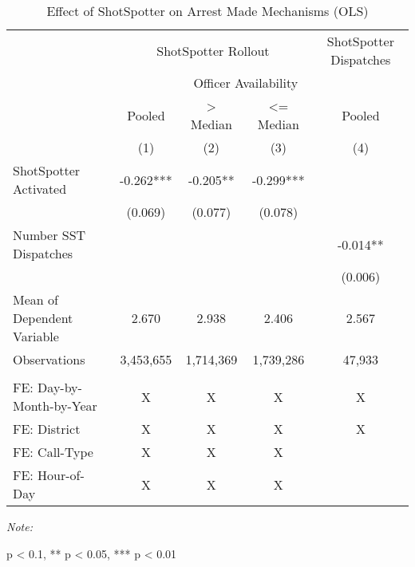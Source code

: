 \begin{table}[H]
\centering
\caption{\label{arrest_mechanism_table}Effect of ShotSpotter on Arrest Made Mechanisms (OLS)}
\centering
\begin{threeparttable}
\fontsize{11}{13}\selectfont
\begin{tabular}[t]{lcccc}
\toprule
\multicolumn{1}{c}{ } & \multicolumn{3}{c}{ShotSpotter Rollout} & \multicolumn{1}{c}{ShotSpotter Dispatches} \\
\cmidrule(l{3pt}r{3pt}){2-4} \cmidrule(l{3pt}r{3pt}){5-5}
\multicolumn{2}{c}{ } & \multicolumn{2}{c}{Officer Availability} & \multicolumn{1}{c}{ } \\
\cmidrule(l{3pt}r{3pt}){3-4}
\multicolumn{1}{c}{ } & \multicolumn{1}{c}{Pooled} & \multicolumn{1}{c}{> Median} & \multicolumn{1}{c}{<= Median} & \multicolumn{1}{c}{Pooled} \\
\cmidrule(l{3pt}r{3pt}){2-2} \cmidrule(l{3pt}r{3pt}){3-3} \cmidrule(l{3pt}r{3pt}){4-4} \cmidrule(l{3pt}r{3pt}){5-5}
  & (1) & (2) & (3) & (4)\\
\midrule
ShotSpotter Activated & -0.262*** & -0.205** & -0.299*** & \\
 & (0.069) & (0.077) & (0.078) & \\
Number SST Dispatches &  &  &  & -0.014**\\
 &  &  &  & (0.006)\\
Mean of Dependent Variable & 2.670 & 2.938 & 2.406 & 2.567\\
\addlinespace
Observations & 3,453,655 & 1,714,369 & 1,739,286 & 47,933\\
\midrule\\
FE: Day-by-Month-by-Year & X & X & X & X\\
FE: District & X & X & X & X\\
FE: Call-Type & X & X & X & \\
FE: Hour-of-Day & X & X & X & \\
\bottomrule
\end{tabular}
\begin{tablenotes}
\item \textit{Note: } 
\item * p < 0.1, ** p < 0.05, *** p < 0.01

\end{tablenotes}
\end{threeparttable}
\end{table}
